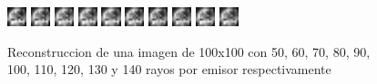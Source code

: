 \begin{figure}[H]
    \centering	
\includegraphics[width=0.05\textwidth]{img/tomo_rayos_50.png}
\includegraphics[width=0.05\textwidth]{img/tomo_rayos_60.png}
\includegraphics[width=0.05\textwidth]{img/tomo_rayos_70.png}
\includegraphics[width=0.05\textwidth]{img/tomo_rayos_80.png}
\includegraphics[width=0.05\textwidth]{img/tomo_rayos_90.png}
\includegraphics[width=0.05\textwidth]{img/tomo_rayos_100.png}
\includegraphics[width=0.05\textwidth]{img/tomo_rayos_110.png}
\includegraphics[width=0.05\textwidth]{img/tomo_rayos_120.png}
\includegraphics[width=0.05\textwidth]{img/tomo_rayos_130.png}
\includegraphics[width=0.05\textwidth]{img/tomo_rayos_140.png}
	\caption{Reconstruccion de una imagen de 100x100 con 50, 60, 70, 80, 90, 100, 110, 120, 130 y 140 rayos por emisor respectivamente}
	\label{fig:rayos}
\end{figure}


